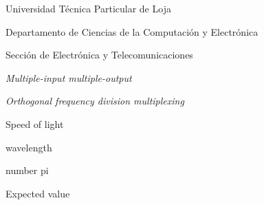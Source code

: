 %
{%
	\item [UTPL] 	Universidad Técnica Particular de Loja 
	\item [DCCE]	Departamento de Ciencias de la Computación y Electrónica 
	\item [SET]		Sección de Electrónica y Telecomunicaciones
	\item [MIMO]	\textit{Multiple-input multiple-output}
	\item [OFDM]	\textit{Orthogonal frequency division multiplexing}	
}
%
%
{%
	\item [$ c $]			Speed of light						
	\item [$ \lambda $]		wavelength
	\item [$ \pi $]			number pi
	\item [\mbox{$E[\cdot]$}]	Expected value
}